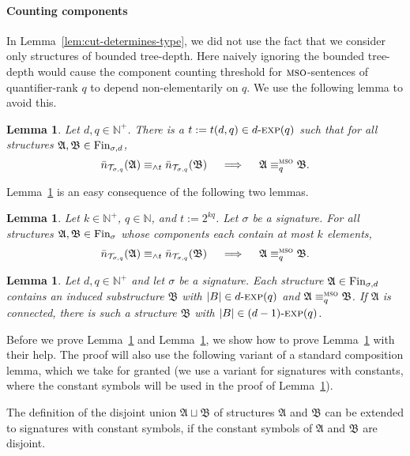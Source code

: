 \documentclass[11pt]{article}
\newtheorem{lemma}[theorem]{Lemma}
\newcommand{\fin}{\textup{Fin}}
\newcommand{\logic}[1]{\textsc{#1}}
\newcommand{\MSO}{\logic{mso}}
\newcommand{\eleq}[1][]{\equiv_{#1}}
\newcommand{\msoeleq}[1][]{\eleq[#1]^{\MSO{}}}
\newcommand{\types}[1][\sigma,q,d]{\mathcal{T}_{#1}}
\newcommand{\maxeq}[1]{\equiv_{{\wedge}#1}}
\newcommand{\struct}[1]{\mathfrak{#1}}
\newcommand{\AS}{\struct{A}}
\newcommand{\BS}{\struct{B}}
\newcommand{\N}{\mathbb{N}}
\newcommand{\Npos}{\mathbb{N}^{+}}
\newcommand{\disunion}{\sqcup}
\newcommand{\nexp}[1][d]{\ensuremath{#1\textnormal{-}\textsc{exp}}}
\begin{document}
\paragraph{Counting components}

In Lemma~\ref{lem:cut-determines-type}, we did not use the fact that we consider
only structures of bounded tree-depth. Here naively ignoring the bounded
tree-depth would cause the component counting threshold for $\MSO$-sentences of
quantifier-rank $q$ to depend non-elementarily on $q$. We use the following
lemma to avoid this.

\begin{lemma}
  \label{lem:msocut}
  Let $d,q\in \Npos$. There is a $t:=t(d,q)\in \nexp[d](q)$ such that
  for all structures $\AS, \BS\in \fin_{\sigma,d}$,
  \[
  \bar n_{\types[\sigma,q]}(\AS) \maxeq{t} \bar n_{\types[\sigma,q]}(\BS)
  \quad\implies\quad
  \AS \msoeleq[q] \BS.
  \]
\end{lemma}

Lemma~\ref{lem:msocut} is an easy consequence of the following two lemmas.

\begin{lemma}
  \label{lem:mso-cut-bounded-size}
  Let $k\in \Npos$, $q\in \N$, and $t:=2^{kq}$. Let $\sigma$ be a
  signature. For all structures $\AS,\BS\in\fin_\sigma$ whose
  components each contain at most $k$ elements,
  \[
  \bar n_{\types[\sigma,q]}(\AS) \maxeq{t} \bar n_{\types[\sigma,q]}(\BS) 
  \quad\implies\quad
  \AS \msoeleq[q] \BS.
  \]
\end{lemma}

\begin{lemma}
  \label{lem:component-bound}
  Let $d,q\in \Npos$ and let $\sigma$ be a signature. Each structure
  $\AS\in\fin_{\sigma,d}$ contains an induced substructure $\BS$ with
  $|B|\in \nexp[d](q)$ and $\AS \msoeleq[q] \BS$. If $\AS$ is
  connected, there is such a structure $\BS$ with $|B|\in
  \nexp[(d-1)](q)$.
\end{lemma}

Before we prove Lemma~\ref{lem:mso-cut-bounded-size} and
Lemma~\ref{lem:component-bound}, we show how to prove Lemma~\ref{lem:msocut}
with their help. The proof will also use the following variant of a standard
composition lemma, which we take for granted (we use a variant for signatures
with constants, where the constant symbols will be used in the proof of
Lemma~\ref{lem:mso-cut-bounded-size}).

The definition of the disjoint union $\AS \disunion \BS$ of structures $\AS$ and
$\BS$ can be extended to signatures with constant symbols, if the constant
symbols of $\AS$ and $\BS$ are disjoint.
\end{document}
